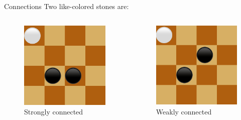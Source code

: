 \documentclass{beamer}
\begin{document}
   \begin{frame}{Connections}
     Two like-colored stones are:
     \vspace{0.5cm}
    \begin{columns}
			\begin{figure}
				\includegraphics[scale=0.35]{images/strong.png}
				\caption*{Strongly connected}
			\end{figure}
					
			\begin{figure}
				\includegraphics[scale=0.35]{images/weak.png}
				\caption*{Weakly connected}
			\end{figure}
		

\end{columns}
\end{frame}
\end{document}
